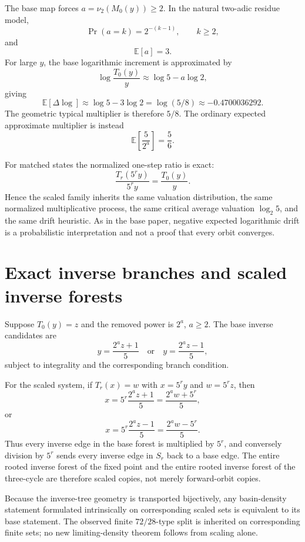 \documentclass[11pt]{article}
\theoremstyle{remark}
\newcommand{\vTwo}{\nu_2}
\begin{document}
The base map forces $a=\vTwo(M_0(y))\ge2$.  In the natural two-adic residue model,
\[
\Pr(a=k)=2^{-(k-1)},\qquad k\ge2,
\]
and
\[
\mathbb E[a]=3.
\]
For large $y$, the base logarithmic increment is approximated by
\[
\log\frac{T_0(y)}{y}\approx\log5-a\log2,
\]
giving
\begin{equation}
\mathbb E[\Delta\log]\approx\log5-3\log2=\log(5/8)\approx-0.4700036292.
\label{eq:drift}
\end{equation}
The geometric typical multiplier is therefore $5/8$.  The ordinary expected approximate multiplier is instead
\[
\mathbb E\!\left[\frac5{2^a}\right]=\frac56.
\]

For matched states the normalized one-step ratio is exact:
\begin{equation}
\frac{T_r(5^ry)}{5^ry}=\frac{T_0(y)}{y}.
\label{eq:normalizedstep}
\end{equation}
Hence the scaled family inherits the same valuation distribution, the same normalized multiplicative process, the same critical average valuation $\log_2 5$, and the same drift heuristic.  As in the base paper, negative expected logarithmic drift is a probabilistic interpretation and not a proof that every orbit converges.

\section{Exact inverse branches and scaled inverse forests}

Suppose $T_0(y)=z$ and the removed power is $2^a$, $a\ge2$.  The base inverse candidates are
\[
y=\frac{2^az+1}{5}
\quad\text{or}\quad
y=\frac{2^az-1}{5},
\]
subject to integrality and the corresponding branch condition.

For the scaled system, if $T_r(x)=w$ with $x=5^ry$ and $w=5^rz$, then
\[
x=5^r\frac{2^az+1}{5}
=\frac{2^aw+5^r}{5},
\]
or
\[
x=5^r\frac{2^az-1}{5}
=\frac{2^aw-5^r}{5}.
\]
Thus every inverse edge in the base forest is multiplied by $5^r$, and conversely division by $5^r$ sends every inverse edge in $S_r$ back to a base edge.  The entire rooted inverse forest of the fixed point and the entire rooted inverse forest of the three-cycle are therefore scaled copies, not merely forward-orbit copies.

Because the inverse-tree geometry is transported bijectively, any basin-density statement formulated intrinsically on corresponding scaled sets is equivalent to its base statement.  The observed finite $72/28$-type split is inherited on corresponding finite sets; no new limiting-density theorem follows from scaling alone.
\end{document}
